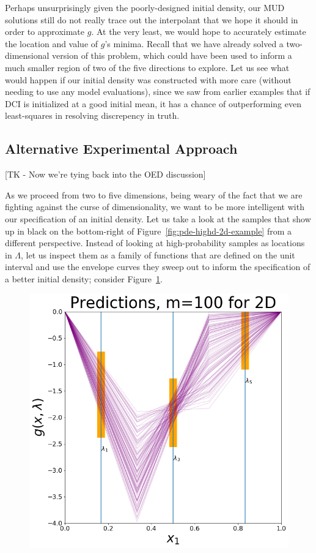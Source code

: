 Perhaps unsurprisingly given the poorly-designed initial density, our MUD solutions still do not really trace out the interpolant that we hope it should in order to approximate $g$.
At the very least, we would hope to accurately estimate the location and value of $g$'s minima.
Recall that we have already solved a two-dimensional version of this problem, which could have been used to inform a much smaller region of two of the five directions to explore.
Let us see what would happen if our initial density was constructed with more care (without needing to use any model evaluations), since we saw from earlier examples that if DCI is initialized at a good initial mean, it has a chance of outperforming even least-squares in resolving discrepency in truth.


\subsection{Alternative Experimental Approach}

[TK - Now we're tying back into the OED discussion]

As we proceed from two to five dimensions, being weary of the fact that we are fighting against the curse of dimensionality, we want to be more intelligent with our specification of an initial density.
Let us take a look at the samples that show up in black on the bottom-right of Figure~\ref{fig:pde-highd-2d-example} from a different perspective.
Instead of looking at high-probability samples as locations in $\Lambda$, let us inspect them as a family of functions that are defined on the unit interval and use the envelope curves they sweep out to inform the specification of a better initial density; consider Figure~\ref{fig:pde-highd-5d-study}.

\begin{figure}[htbp]
\centering
  \includegraphics[width=0.675\linewidth]{figures/pde-highd/pde-highd-alt_initial_D5_m100.png}
\caption{
}
\label{fig:pde-highd-5d-study}
\end{figure}

